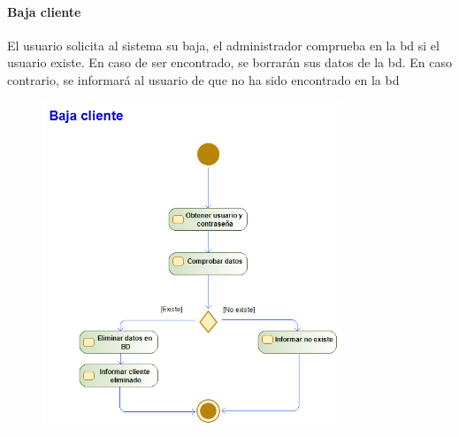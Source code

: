 \paragraph{Baja cliente}
El usuario solicita al sistema su baja, el administrador comprueba en la \gls{bd} si el usuario existe. En caso de ser encontrado, se borrarán sus datos de la \gls{bd}. En caso contrario, se informará al usuario de que no ha sido encontrado en la \gls{bd}
\begin{figure}[H]
    \centering
    \includegraphics[width=0.8\textwidth]{Use_Cases/baja_cliente.png}
\end{figure}
\newpage

